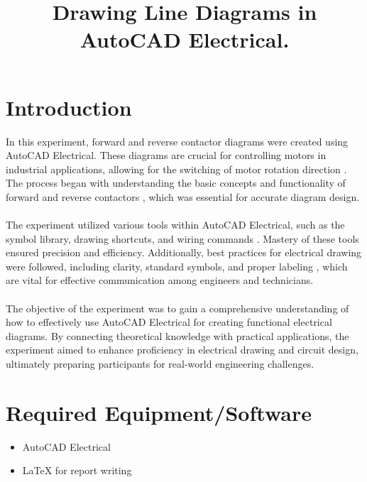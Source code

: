 \documentclass[12pt]{article}
\title{Drawing Line Diagrams in AutoCAD Electrical.}
\author{}
\date{}
\begin{document}


\pagebreak

\tableofcontents

\pagebreak
{}
\maketitle

\section*{Introduction}
In this experiment, forward and reverse contactor diagrams were created using AutoCAD Electrical. These diagrams are crucial for controlling motors in industrial applications, allowing for the switching of motor rotation direction \cite{motor_control}. The process began with understanding the basic concepts and functionality of forward and reverse contactors \cite{contactor_basics}, which was essential for accurate diagram design.
\\\\
The experiment utilized various tools within AutoCAD Electrical, such as the symbol library, drawing shortcuts, and wiring commands \cite{autocad_tools}. Mastery of these tools ensured precision and efficiency. Additionally, best practices for electrical drawing were followed, including clarity, standard symbols, and proper labeling \cite{electrical_drawing}, which are vital for effective communication among engineers and technicians.
\\\\
The objective of the experiment was to gain a comprehensive understanding of how to effectively use AutoCAD Electrical for creating functional electrical diagrams. By connecting theoretical knowledge with practical applications, the experiment aimed to enhance proficiency in electrical drawing and circuit design, ultimately preparing participants for real-world engineering challenges.

\section*{Required Equipment/Software}
\begin{itemize}
    \item AutoCAD Electrical
    \item \LaTeX{} for report writing
\end{itemize}
\end{document}
